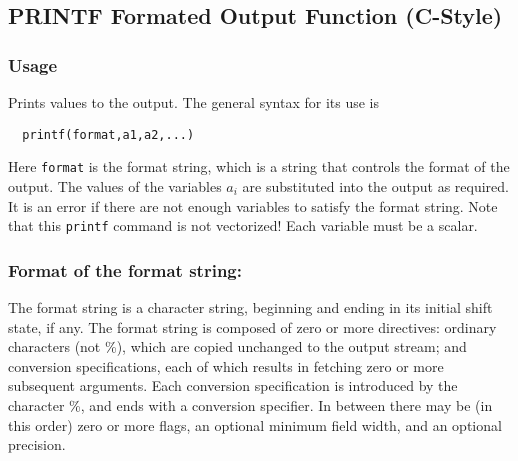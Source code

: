 %
%
%
\subsection{PRINTF Formated Output Function (C-Style)}
\subsubsection{Usage}
Prints values to the output.  The general syntax for its use is
\begin{verbatim}
  printf(format,a1,a2,...)
\end{verbatim}
Here \verb|format| is the format string, which is a string that
controls the format of the output.  The values of the variables
$a_i$ are substituted into the output as required.  It is
an error if there are not enough variables to satisfy the format
string.  Note that this \verb|printf| command is not vectorized!  Each
variable must be a scalar.

\subsubsection{Format of the format string:}

The  format  string  is a character string, beginning and ending in its
initial shift state, if any.  The format string is composed of zero  or
more   directives:  ordinary  characters  (not  \%),  which  are  copied
unchanged to the output stream; and conversion specifications, each  of
which results in fetching zero or more subsequent arguments.  Each 
conversion specification is introduced by the character \%, and ends with a
conversion  specifier.  In between there may be (in this order) zero or
more flags, an optional minimum field width, and an optional precision.

